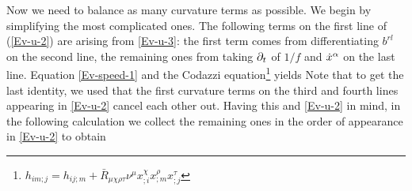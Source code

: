 {Now we need to balance as many curvature terms as possible. We begin by simplifying the most complicated ones. The following terms on the first line of (\ref{Ev-u-2}) are arising from \eqref{Ev-u-3}: the first term comes from differentiating $b^{rl}$ on the second line, the remaining ones from taking $\partial_{t}$ of $1/f$ and $\dot{x}^{\alpha}$ on the last line. Equation \eqref{Ev-speed-1} and the Codazzi equation\footnote{$h_{im;j}=h_{ij;m}+\bar{R}_{\mu\chi\rho\tau}\nu^{\mu}x^{\chi}_{;i}x^{\rho}_{;m}x^{\tau}_{;j}$} yields
Note that to get the last identity, we used that the first curvature terms on the third and fourth lines appearing in \eqref{Ev-u-2} cancel each other out. Having this and \eqref{Ev-u-2} in mind, in the following calculation we collect the remaining ones in the order of appearance in \eqref{Ev-u-2} to obtain 
}
